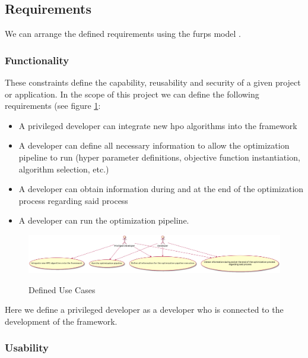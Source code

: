 
\subsection{Requirements}


We can arrange the defined requirements using the \acrfull{furps} model \parencite{furps}.

\subsubsection{Functionality}

These constraints define the capability, reusability and security of a given project or application. In the scope of this project we can define the following requirements (see figure \ref{fig:use_cases}:

\begin{itemize}
	\item A privileged developer can integrate new \acrshort{hpo} algorithms into the framework
	\item A developer can define all necessary information to allow the optimization pipeline to run (hyper parameter definitions, objective function instantiation, algorithm selection, etc.)
	\item A developer can obtain information during and at the end of the optimization process regarding said process
	\item A developer can run the optimization pipeline.
\end{itemize}


\begin{figure}[hb]
\centering
\includegraphics[width = \textwidth]{images/domain_model.png}
\label{fig:use_cases}
\caption{Defined Use Cases}
\end{figure}


Here we define a privileged developer as a developer who is connected to the development of the framework.

\subsubsection{Usability}

